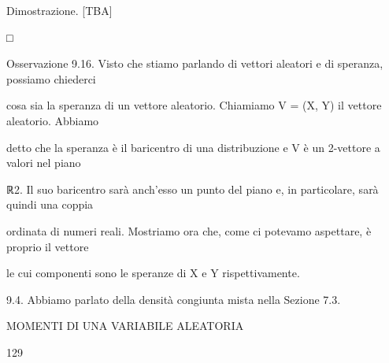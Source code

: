 \documentclass[a4paper,portrait,12pt]{article}
\begin{document}
\begin{flushleft}
Dimostrazione. [TBA]
\end{flushleft}





□





\begin{flushleft}
Osservazione 9.16. Visto che stiamo parlando di vettori aleatori e di speranza, possiamo chiederci
\end{flushleft}


\begin{flushleft}
cosa sia la speranza di un vettore aleatorio. Chiamiamo V = (X, Y) il vettore aleatorio. Abbiamo
\end{flushleft}


\begin{flushleft}
detto che la speranza \`{e} il baricentro di una distribuzione e V \`{e} un 2-vettore a valori nel piano
\end{flushleft}


\begin{flushleft}
ℝ2. Il suo baricentro sar\`{a} anch'esso un punto del piano e, in particolare, sar\`{a} quindi una coppia
\end{flushleft}


\begin{flushleft}
ordinata di numeri reali. Mostriamo ora che, come ci potevamo aspettare, \`{e} proprio il vettore
\end{flushleft}


\begin{flushleft}
le cui componenti sono le speranze di X e Y rispettivamente.
\end{flushleft}


\begin{flushleft}
9.4. Abbiamo parlato della densit\`{a} congiunta mista nella Sezione 7.3.
\end{flushleft}





\begin{flushleft}
 MOMENTI DI UNA VARIABILE ALEATORIA
\end{flushleft}





129
\end{document}

